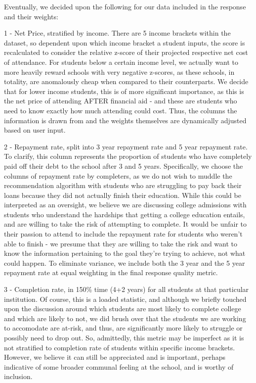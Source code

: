 \documentclass{article}
\begin{document}
Eventually, we decided upon the following for our data included in the response and their weights:


1 - Net Price, stratified by income. There are 5 income brackets within the dataset, so dependent upon which income bracket a student inputs, the score is recalculated to consider the relative z-score of their projected respective net cost of attendance. For students below a certain income level, we actually want to more heavily reward schools with very negative z-scores, as these schools, in totality, are anomalously cheap when compared to their counterparts. We decide that for lower income students, this is of more significant importance, as this is the net price of attending AFTER financial aid - and these are students who need to know exactly how much attending could cost. Thus, the columns the information is drawn from and the weights themselves are dynamically adjusted based on user input.

2 - Repayment rate, split into 3 year repayment rate and 5 year repayment rate. To clarify, this column represents the proportion of students who have completely paid off their debt to the school after 3 and 5 years.  Specifically, we choose the columns of repayment rate by completers, as we do not wish to muddle the recommendation algorithm with students who are struggling to pay back their loans because they did not actually finish their education. While this could be interpreted as an oversight, we believe we are discussing college admissions with students who understand the hardships that getting a college education entails, and are willing to take the risk of attempting to complete. It would be unfair to their passion to attend to include the repayment rate for students who weren't able to finish - we presume that they are willing to take the risk and want to know the information pertaining to the goal they're trying to achieve, not what could happen. To eliminate variance, we include both the 3 year and the 5 year repayment rate at equal weighting in the final response quality metric.

3 - Completion rate, in 150\% time (4+2 years) for all students at that particular institution. Of course, this is a loaded statistic, and although we briefly touched upon the discussion around which students are most likely to complete college and which are likely to not, we did brush over that the students we are working to accomodate are at-risk, and thus, are significantly more likely to struggle or possibly need to drop out. So, admittedly, this metric may be imperfect as it is not stratified to completion rate of students within specific income brackets. However, we believe it can still be appreciated and is important, perhaps indicative of some broader communal feeling at the school, and is worthy of inclusion. 
\end{document}
